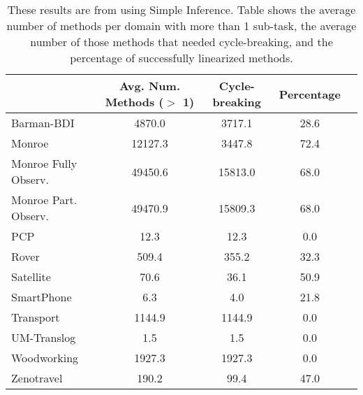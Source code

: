 \begin{table}
	\centering
	\caption{These results are from using Simple Inference. Table shows the average number of methods per domain with more than 1 sub-task, the average number of those methods that needed cycle-breaking, and the percentage of successfully linearized methods.}
	\label{table:SimpleLinearizable}
		\scalebox{0.65} {
	\begin{tabular}{lcccl}
		\toprule
		& Avg. Num. Methods ($>$ 1) & Cycle-breaking & Percentage &  \\
		\midrule
Barman-BDI & 4870.0 & 3717.1 & 28.6  \\
Monroe & 12127.3 & 3447.8 & 72.4  \\
Monroe Fully Observ. & 49450.6 & 15813.0 & 68.0  \\
Monroe Part. Observ. & 49470.9 & 15809.3 & 68.0  \\
PCP & 12.3 & 12.3 & 0.0  \\
Rover & 509.4 & 355.2 & 32.3  \\
Satellite & 70.6 & 36.1 & 50.9  \\
SmartPhone & 6.3 & 4.0 & 21.8  \\
Transport & 1144.9 & 1144.9 & 0.0  \\
UM-Translog & 1.5 & 1.5 & 0.0  \\
Woodworking & 1927.3 & 1927.3 & 0.0  \\
Zenotravel & 190.2 & 99.4 & 47.0  \\
		\bottomrule
	\end{tabular}
}
\end{table}
